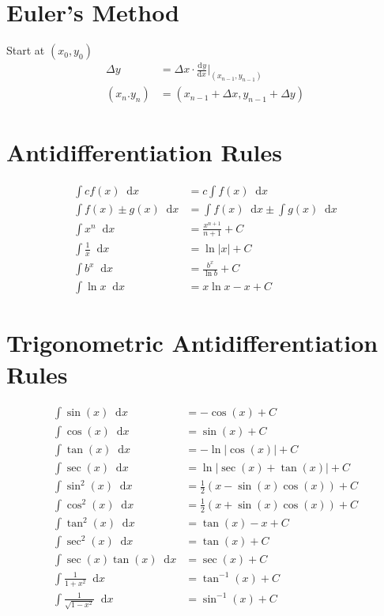 \documentclass[12pt]{article}
\newcommand*{\asin}{\sin^{-1}}
\newcommand*{\atan}{\tan^{-1}}
\newcommand*{\dd}[3][]{\tfrac{\mathrm{d}^{#1}#2}{\mathrm{d}#3^{#1}}}
\newcommand*{\D}[1]{\mathop{}\!\mathrm{d} #1}
\newenvironment{rmbskip}{\setlength{\belowdisplayskip}{0pt}\ignorespaces}%
  {\ignorespacesafterend}
\newenvironment{rmskip}{\setlength{\abovedisplayskip}{0pt}%
  \setlength{\belowdisplayskip}{0pt}\ignorespaces}%
  {\ignorespacesafterend}
\begin{document}
\section*{Euler's Method}
Start at \((x_0,y_0)\)
\begin{rmbskip}
  \begin{align*}
    \Delta y &= \Delta x \cdot \dd{y}{x} \biggr|_{(x_{n-1},y_{n-1})}\\
    (x_n.y_n) &= (x_{n-1} + \Delta x, y_{n-1} + \Delta y)
  \end{align*}
\end{rmbskip}
\section*{Antidifferentiation Rules}
\begin{rmskip}
  \begin{align*}
    \int cf(x) \D{x} &= c \int f(x) \D{x}\\
    \int f(x) \pm g(x) \D{x} &= \int f(x) \D{x} \pm \int g(x) \D{x}\\
    \int x^n \D{x} &= \frac{x^{n+1}}{n+1} + C\\
    \int \frac{1}{x} \D{x} &= \ln|x| + C\\
    \int b^x \D{x} &= \frac{b^x}{\ln b} + C\\
    \int \ln x \D{x} &= x\ln x - x + C
  \end{align*}
\end{rmskip}
\section*{Trigonometric Antidifferentiation Rules}
\begin{rmskip}
  \begin{align*}
    \int \sin(x) \D{x} &= -\cos(x) + C\\
    \int \cos(x) \D{x} &= \sin(x) + C\\
    \int \tan(x) \D{x} &= -\ln|\cos(x)| + C\\
    \int \sec(x) \D{x} &= \ln|\sec(x)+\tan(x)| + C\\
    \int \sin^2(x) \D{x} &= \frac{1}{2} (x - \sin(x)\cos(x)) + C\\
    \int \cos^2(x) \D{x} &= \frac{1}{2} (x + \sin(x)\cos(x)) + C\\
    \int \tan^2(x) \D{x} &= \tan(x) - x + C\\
    \int \sec^2(x) \D{x} &= \tan(x) + C\\
    \int \sec(x) \tan(x) \D{x} &= \sec(x) + C\\
    \int \frac{1}{1+x^2} \D{x} &= \atan(x) + C\\
    \int \frac{1}{\sqrt{1-x^2}} \D{x} &= \asin(x) + C
  \end{align*}
\end{rmskip}
\end{document}
